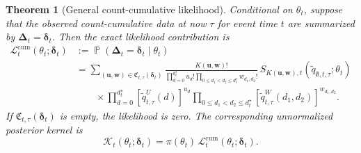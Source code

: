 \documentclass{article}
\newtheorem{theorem}{Theorem}
\theoremstyle{definition}
\theoremstyle{remark}
\newcommand{\Prb}{\operatorname{\mathbb{P}}}
\begin{document}
\begin{theorem}[General count-cumulative likelihood]\label{thm:generalcum}
Conditional on $\theta_t$, suppose that the observed count-cumulative data at now $\tau$ for event time $t$ are summarized by $\boldsymbol\Delta_t=\boldsymbol\delta_t$. Then the exact likelihood contribution is
\begin{equation}\label{generalcumlik}
\begin{split}
    \mathcal L_t^{\mathrm{cum}}(\theta_t;\boldsymbol\delta_t)
    &:={}
    \Prb(\boldsymbol\Delta_t=\boldsymbol\delta_t\mid\theta_t)\\
    &=
    \sum_{(\boldsymbol u,\boldsymbol w)\in
    \mathfrak C_{t,\tau}(\boldsymbol\delta_t)}
    \frac{K(\boldsymbol u,\boldsymbol w)!}
    {
    \displaystyle\prod_{d=0}^{d_t^{\star}}u_d!
    \displaystyle\prod_{0\leq d_1<d_2\leq d_t^{\star}}w_{d_1,d_2}!}
    \,
    S_{K(\boldsymbol u,\boldsymbol w),t}
    \left(\tilde q_{\emptyset,t,\tau};\theta_t\right)\\
    &\qquad\times
    \prod_{d=0}^{d_t^{\star}}
    \left[\tilde q_{t,\tau}^{U}(d)\right]^{u_d}
    \prod_{0\leq d_1<d_2\leq d_t^{\star}}
    \left[\tilde q_{t,\tau}^{W}(d_1,d_2)\right]^{w_{d_1,d_2}}.
\end{split}
\end{equation}
If $\mathfrak C_{t,\tau}(\boldsymbol\delta_t)$ is empty, the likelihood is zero. The corresponding unnormalized posterior kernel is
\begin{equation}\label{generalcumpost}
    \mathcal K_t(\theta_t;\boldsymbol\delta_t)
    =
    \pi(\theta_t)\,
    \mathcal L_t^{\mathrm{cum}}(\theta_t;\boldsymbol\delta_t).
\end{equation}


\end{theorem}
\end{document}
